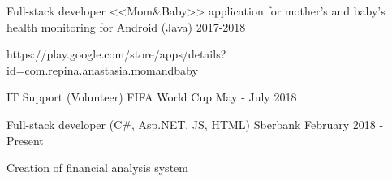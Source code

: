 



\cventry
{Full-stack developer} %
{<<Mom\&Baby>> application for mother's and baby's health monitoring for Android  (Java) } %
{} %
{2017-2018} %
{ %
	\begin{cvitems}
		\item {https://play.google.com/store/apps/details?id=com.repina.anastasia.momandbaby}
	\end{cvitems}
}

\cventrynodescription
{IT Support (Volunteer)} %
{FIFA World Cup} %
{} %
{May - July 2018} %

\cventry
{Full-stack developer (C\#, Asp.NET, JS, HTML)} %
{Sberbank} %
{} %
{February 2018 - Present} %
{ 
	\begin{cvitems}
		\item {Creation of financial analysis system}
	\end{cvitems}
}

